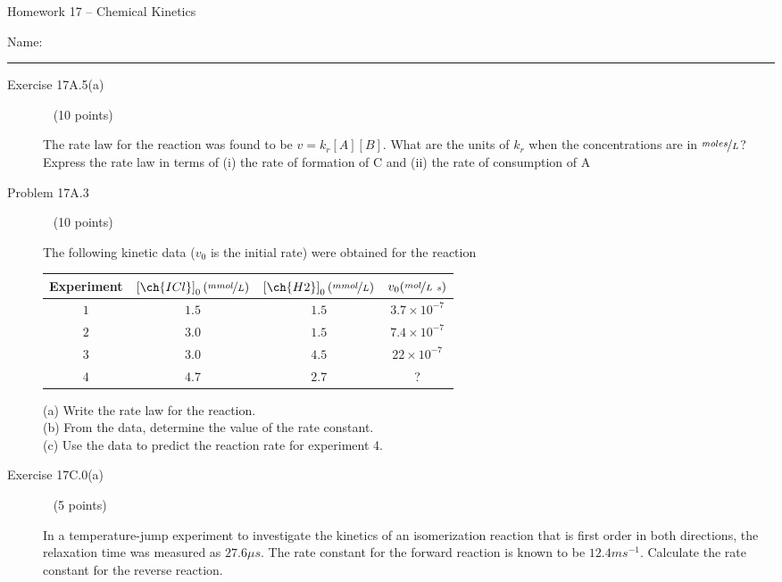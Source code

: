 \documentclass[12pt, openany, letterpaper]{memoir}
\begin{document}
\begin{center}
	{\large Homework 17 -- Chemical Kinetics}
\end{center}

Name: \rule[-.1mm]{15em}{0.1pt}

\begin{description}	
	\item [Exercise 17A.5(a)] ~ (10 points)
	
	The rate law for the reaction  was found to be $v=k_r[A][B]$. What are the units of $k_r$ when the concentrations are in $\nicefrac{moles}{L}$? Express the rate law in terms of (i) the rate of formation of C and (ii) the rate of consumption of A
	
	\vspace{10em}
	\item [Problem 17A.3] ~ (10 points)
	
	
	The following kinetic data ($v_0$ is the initial rate) were obtained for the reaction \\
	
	\begin{tabular}{cccc}
		Experiment & $\left[\ch{ICl}\right]_0 (\nicefrac{mmol}{L})$ & $\left[\ch{H2}\right]_0 (\nicefrac{mmol}{L})$ & $v_0 (\nicefrac{mol}{L~s})$ \\ \midrule
		$1$ & $1.5$ & $1.5$ & $3.7\times10^{-7}$\\
		$2$ & $3.0$ & $1.5$ & $7.4\times10^{-7}$\\
		$3$ & $3.0$ & $4.5$ & $22\times10^{-7}$\\
		$4$ & $4.7$ & $2.7$ & ?\\
	\end{tabular}
	
	(a) Write the rate law for the reaction. \\
	(b) From the data, determine the value of the rate constant. \\
	(c) Use the data to predict the reaction rate for experiment 4.
	
	\vspace{18em}
	\item [Exercise 17C.0(a)] ~ (5 points)
	
	In a temperature-jump experiment to investigate the kinetics of an isomerization reaction that is first order in both directions, the relaxation time was measured as $27.6\mu s$. The rate constant for the forward reaction is known to be $12.4 ms^{-1}$. Calculate the rate constant for the reverse reaction.
	

\end{description}
\end{document}
